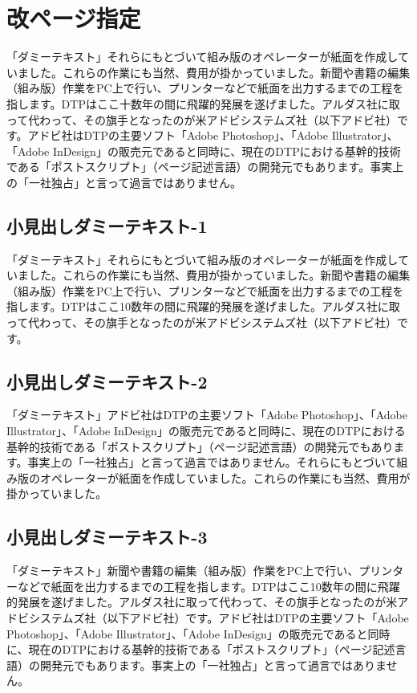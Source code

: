 \documentclass{cuxarticle}
\begin{document}
\section{改ページ指定}
「ダミーテキスト」それらにもとづいて組み版のオペレーターが紙面を作成していました。これらの作業にも当然、費用が掛かっていました。新聞や書籍の編集（組み版）作業をPC上で行い、プリンターなどで紙面を出力するまでの工程を指します。DTPはここ十数年の間に飛躍的発展を遂げました。アルダス社に取って代わって、その旗手となったのが米アドビシステムズ社（以下アドビ社）です。アドビ社はDTPの主要ソフト「Adobe Photoshop」、「Adobe Illustrator」、「Adobe InDesign」の販売元であると同時に、現在のDTPにおける基幹的技術である「ポストスクリプト」（ページ記述言語）の開発元でもあります。事実上の「一社独占」と言って過言ではありません。

\subsection{小見出しダミーテキスト-1}
「ダミーテキスト」それらにもとづいて組み版のオペレーターが紙面を作成していました。これらの作業にも当然、費用が掛かっていました。新聞や書籍の編集（組み版）作業をPC上で行い、プリンターなどで紙面を出力するまでの工程を指します。DTPはここ10数年の間に飛躍的発展を遂げました。アルダス社に取って代わって、その旗手となったのが米アドビシステムズ社（以下アドビ社）です。

\subsection{小見出しダミーテキスト-2}
「ダミーテキスト」アドビ社はDTPの主要ソフト「Adobe Photoshop」、「Adobe Illustrator」、「Adobe InDesign」の販売元であると同時に、現在のDTPにおける基幹的技術である「ポストスクリプト」（ページ記述言語）の開発元でもあります。事実上の「一社独占」と言って過言ではありません。それらにもとづいて組み版のオペレーターが紙面を作成していました。これらの作業にも当然、費用が掛かっていました。

\subsection{小見出しダミーテキスト-3}
「ダミーテキスト」新聞や書籍の編集（組み版）作業をPC上で行い、プリンターなどで紙面を出力するまでの工程を指します。DTPはここ10数年の間に飛躍的発展を遂げました。アルダス社に取って代わって、その旗手となったのが米アドビシステムズ社（以下アドビ社）です。アドビ社はDTPの主要ソフト「Adobe Photoshop」、「Adobe Illustrator」、「Adobe InDesign」の販売元であると同時に、現在のDTPにおける基幹的技術である「ポストスクリプト」（ページ記述言語）の開発元でもあります。事実上の「一社独占」と言って過言ではありません。
\end{document}
